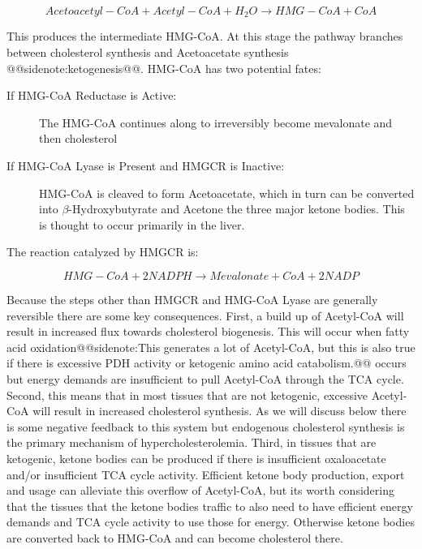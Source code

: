\documentclass{tufte-handout}
\makeatletter
\def\sidenote#1{@@sidenote:#1@@}
\makeatother
\begin{document}
\begin{equation}\label{eq:hmgcs}
Acetoacetyl-CoA + Acetyl-CoA + H_2O \rightarrow HMG-CoA + CoA
\end{equation}

This produces the intermediate HMG-CoA.  At this stage the pathway branches between cholesterol synthesis and Acetoacetate synthesis \sidenote{ketogenesis}.  HMG-CoA has two potential fates:
\begin{description}
\item [If HMG-CoA Reductase is Active:] The HMG-CoA continues along to irreversibly become mevalonate and then cholesterol
\item [If HMG-CoA Lyase is Present and HMGCR is Inactive:] HMG-CoA is cleaved to form Acetoacetate, which in turn can be converted into $\beta$-Hydroxybutyrate and Acetone the three major ketone bodies.  This is thought to occur primarily in the liver.
\end{description}

The reaction catalyzed by HMGCR is:

\begin{equation}\label{eq:hmgcr}
HMG-CoA + 2NADPH \rightarrow Mevalonate + CoA + 2NADP
\end{equation}

 Because the steps other than HMGCR and HMG-CoA Lyase are generally reversible there are some key consequences.  First, a build up of Acetyl-CoA will result in increased flux towards cholesterol biogenesis.  This will occur when fatty acid oxidation\sidenote{This generates a lot of Acetyl-CoA, but this is also true if there is excessive PDH activity or ketogenic amino acid catabolism.} occurs but energy demands are insufficient to pull Acetyl-CoA through the TCA cycle.  Second, this means that in most tissues that are not ketogenic, excessive Acetyl-CoA will result in increased cholesterol synthesis.  As we will discuss below there is some negative feedback to this system but endogenous cholesterol synthesis is the primary mechanism of hypercholesterolemia.  Third, in tissues that are ketogenic, ketone bodies can be produced if there is insufficient oxaloacetate and/or insufficient TCA cycle activity.  Efficient ketone body production, export and usage can alleviate this overflow of Acetyl-CoA, but its worth considering that the tissues that the ketone bodies traffic to also need to have efficient energy demands and TCA cycle activity to use those for energy.  Otherwise ketone bodies are converted back to HMG-CoA and can become cholesterol there.
\end{document}
